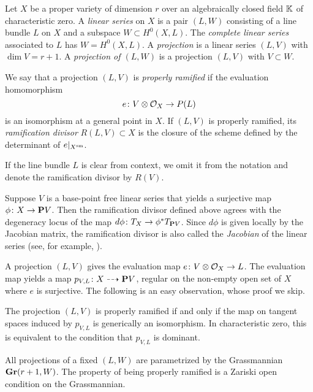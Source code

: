 Let $X$ be a proper variety of dimension $r$ over an algebraically closed field $\mathbb{K}$ of characteristic zero.
A \emph{linear series} on $X$ is a pair $(L, W)$ consisting of a line bundle $L$ on $X$ and a subspace $W \subset H^0(X, L)$.
The \emph{complete linear series} associated to $L$ has $W = H^0(X, L)$.
A \emph{projection} is a linear series $(L, V)$ with $\dim V = r+1$.
A \emph{projection of $(L, W)$} is a projection $(L, V)$ with $V \subset W$.

\begin{definition}
  \label{def:properlyramified}
We say that a projection $(L,V)$ is \emph{properly ramified} if the evaluation homomorphism
\[e {\colon} V \otimes \mathcal O_{X} \to P(L)\]
is an isomorphism at a general point in $X$.  If $(L,V)$ is properly ramified, its \emph{ramification divisor} $R(L,V) \subset X$
is the closure of the scheme defined by the determinant of $e|_{X^{\rm sm}}$.
\end{definition}
If the line bundle $L$ is clear from context, we omit it from the notation and denote the ramification divisor by $R(V)$.
\begin{remark}\label{rem:Jacobian}
  Suppose $V$ is a base-point free linear series that yields a surjective map $\phi {\colon} X \to {\bf P} V$.
  Then the ramification divisor defined above agrees with the degeneracy locus of the map
  $d \phi {\colon} T_{X} \to \phi^* T_{{\bf P} V}$.
  Since $d \phi$ is given locally by the Jacobian matrix, the ramification divisor is also called the \emph{Jacobian} of the linear series (see, for example, \cite[1.1.7]{dol:12}).
\end{remark}

A projection $(L, V)$ gives the evaluation map
$e {\colon} V \otimes \mathcal O_X \to L$.
The evaluation map yields a map $p_{V,L} {\colon} X \dashrightarrow {\bf P} V$, regular on the non-empty open set of $X$ where $e$ is surjective.
The following is an easy observation, whose proof we skip.
\begin{proposition}\label{prop:proj}
  The projection $(L, V)$ is properly ramified if and only if the map on tangent spaces induced by $p_{V,L}$ is generically an isomorphism.
  In characteristic zero, this is equivalent to the condition that $p_{V,L}$ is dominant.
\end{proposition}

All projections of a fixed $(L, W)$ are parametrized by the Grassmannian ${\bf Gr}(r+1, W)$.
The property of being properly ramified is a Zariski open condition on the Grassmannian.

